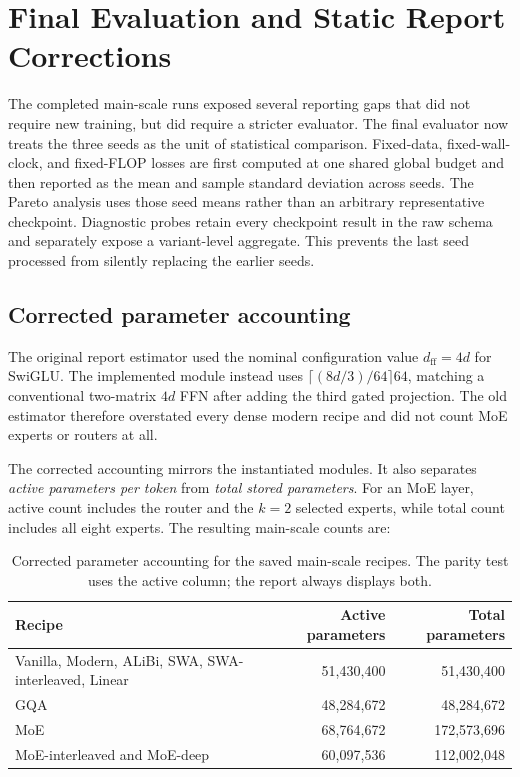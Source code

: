 \documentclass[11pt,a4paper]{article}
\theoremstyle{definition}
\theoremstyle{plain}
\begin{document}
\section{Final Evaluation and Static Report Corrections}
\label{sec:final-evaluation-corrections}

The completed main-scale runs exposed several reporting gaps that did not require
new training, but did require a stricter evaluator.  The final evaluator now treats
the three seeds as the unit of statistical comparison.  Fixed-data,
fixed-wall-clock, and fixed-FLOP losses are first computed at one shared global
budget and then reported as the mean and sample standard deviation across seeds.
The Pareto analysis uses those seed means rather than an arbitrary representative
checkpoint.  Diagnostic probes retain every checkpoint result in the raw schema
and separately expose a variant-level aggregate.  This prevents the last seed
processed from silently replacing the earlier seeds.

\subsection{Corrected parameter accounting}

The original report estimator used the nominal configuration value
$d_{\mathrm{ff}}=4d$ for SwiGLU.  The implemented module instead uses
$\lceil(8d/3)/64\rceil 64$, matching a conventional two-matrix $4d$ FFN after
adding the third gated projection.  The old estimator therefore overstated every
dense modern recipe and did not count MoE experts or routers at all.

The corrected accounting mirrors the instantiated modules.  It also separates
\emph{active parameters per token} from \emph{total stored parameters}.  For an
MoE layer, active count includes the router and the $k=2$ selected experts, while
total count includes all eight experts.  The resulting main-scale counts are:

\begin{table}[H]
\centering
\small
\begin{tabular}{lrr}
\toprule
Recipe & Active parameters & Total parameters \\
\midrule
Vanilla, Modern, ALiBi, SWA, SWA-interleaved, Linear & 51,430,400 & 51,430,400 \\
GQA & 48,284,672 & 48,284,672 \\
MoE & 68,764,672 & 172,573,696 \\
MoE-interleaved and MoE-deep & 60,097,536 & 112,002,048 \\
\bottomrule
\end{tabular}
\caption{Corrected parameter accounting for the saved main-scale recipes.
The parity test uses the active column; the report always displays both.}
\label{tab:corrected-parameter-counts}
\end{table}
\end{document}
